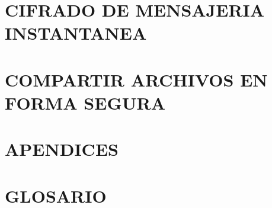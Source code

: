 \documentclass[oribibl,oneside,pdftext]{scrbook}
\begin{document}
\chapter{CIFRADO DE MENSAJERIA INSTANTANEA}
\clearpage

\graphicspath{{./capitulo_14_COMPARTIR_ARCHIVOS_EN_FORMA_SEGURA/}}
\chapter{COMPARTIR ARCHIVOS EN FORMA SEGURA}
\clearpage

\clearpage

\graphicspath{{./capitulo_15_APENDICES/}}
\chapter{APENDICES}
\clearpage

\clearpage

\clearpage

\graphicspath{{./capitulo_16_GLOSARIO/}}
\chapter{GLOSARIO}
\clearpage

\end{document}

